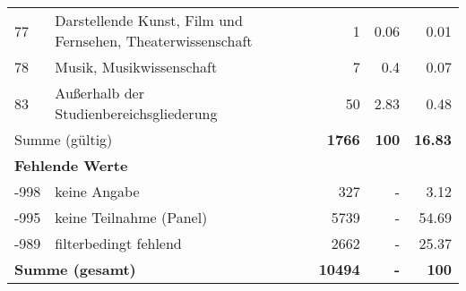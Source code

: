 \begin{longtable}{lXrrr}
        77 & \multicolumn{1}{X}{Darstellende Kunst, Film und Fernsehen, Theaterwissenschaft} & %
          \num{1} &
          \num[round-mode=places,round-precision=2]{0.06} &
          \num[round-mode=places,round-precision=2]{0.01} \\

        78 & \multicolumn{1}{X}{Musik, Musikwissenschaft} & %
          \num{7} &
          \num[round-mode=places,round-precision=2]{0.4} &
          \num[round-mode=places,round-precision=2]{0.07} \\

        83 & \multicolumn{1}{X}{Außerhalb der Studienbereichsgliederung} & %
          \num{50} &
          \num[round-mode=places,round-precision=2]{2.83} &
          \num[round-mode=places,round-precision=2]{0.48} \\

     \midrule
     \multicolumn{2}{l}{Summe (gültig)} &
       \textbf{\num{1766}} &
     \textbf{\num{100}} &
       \textbf{\num[round-mode=places,round-precision=2]{16.83}} \\
     \multicolumn{5}{l}{\textbf{Fehlende Werte}}\\
       -998 &
       keine Angabe &
         \num{327} &
        - &
         \num[round-mode=places,round-precision=2]{3.12} \\
       -995 &
       keine Teilnahme (Panel) &
         \num{5739} &
        - &
         \num[round-mode=places,round-precision=2]{54.69} \\
       -989 &
       filterbedingt fehlend &
         \num{2662} &
        - &
         \num[round-mode=places,round-precision=2]{25.37} \\
     \midrule
     \multicolumn{2}{l}{\textbf{Summe (gesamt)}} &
          \textbf{\num{10494}} &
        \textbf{-} &
        \textbf{\num{100}} \\
     \bottomrule
     \end{longtable}
     
